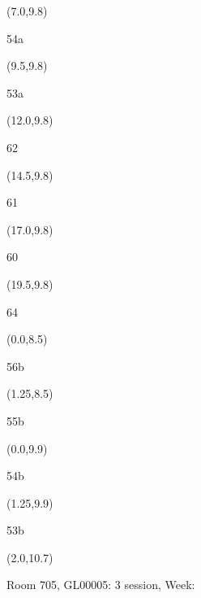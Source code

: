 \documentclass[a4paper]{article}
\newcommand{\myseat}[5]{%
\vspace{-0.1cm} \hspace{-0.5cm}
\parbox[t][2.2cm][t]{3.5cm}{%
\small #1 %
\begin{description}
\vspace{-0.1cm}
\item [ID:] #2
\vspace{-0.1cm}
\item [Team:] #3 \normalsize
\vspace{-0.1cm}
\item \normalsize #4 #5
\vspace{-0.1cm}
\end{description}
}
}
\begin{document}
\begin{CJK}{UTF8}{cyberbit}
\begin{textblock}{2.5}(7.0,9.8)
\textblockcolor{}
\myseat{54a}{}{}{}{}
\end{textblock}

\begin{textblock}{2.5}(9.5,9.8)
\textblockcolor{}
\myseat{53a}{}{}{}{}
\end{textblock}

\begin{textblock}{2.5}(12.0,9.8)
\textblockcolor{}
\myseat{62}{}{}{}{}
\end{textblock}

\begin{textblock}{2.5}(14.5,9.8)
\textblockcolor{}
\myseat{61}{}{}{}{}
\end{textblock}

\begin{textblock}{2.5}(17.0,9.8)
\textblockcolor{}
\myseat{60}{}{}{}{}
\end{textblock}

\begin{textblock}{2.5}(19.5,9.8)
\textblockcolor{}
\myseat{64}{}{}{}{}
\end{textblock}


\begin{textblock}{1.25}(0.0,8.5)
\textblockcolor{}
\myseat{56b}{}{}{}{}
\end{textblock}

\begin{textblock}{1.25}(1.25,8.5)
\textblockcolor{}
\myseat{55b}{}{}{}{}
\end{textblock}

\begin{textblock}{1.25}(0.0,9.9)
\textblockcolor{}
\myseat{54b}{}{}{}{}
\end{textblock}

\begin{textblock}{1.25}(1.25,9.9)
\textblockcolor{}
\myseat{53b}{}{}{}{}
\end{textblock}


\begin{textblock}{10}(2.0,10.7)
\textblockcolor{}
\parbox[t][2.2cm][t]{9.5cm}{%
\large Room 705, GL00005: 3 session, Week: 
\vspace{-0.3cm} \hspace{-0.5cm}
}
\end{textblock}

\end{CJK}
\end{document}
